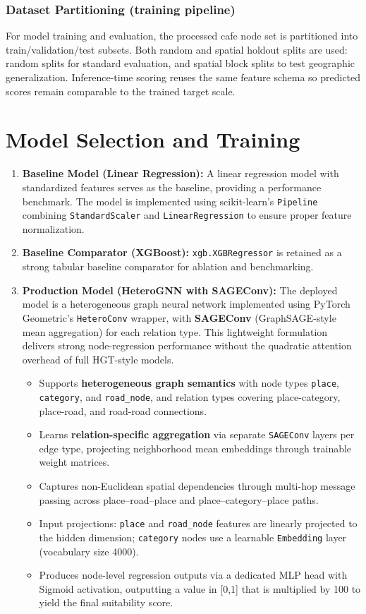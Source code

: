 \subsubsection{Dataset Partitioning (training pipeline)}
For model training and evaluation, the processed cafe node set is partitioned into train/validation/test subsets. Both random and spatial holdout splits are used: random splits for standard evaluation, and spatial block splits to test geographic generalization. Inference-time scoring reuses the same feature schema so predicted scores remain comparable to the trained target scale.

\section{Model Selection and Training}
\begin{enumerate}
	\item \textbf{Baseline Model (Linear Regression):} A linear regression model with standardized features serves as the baseline, providing a performance benchmark. The model is implemented using scikit-learn's \texttt{Pipeline} combining \texttt{StandardScaler} and \texttt{LinearRegression} to ensure proper feature normalization.
	
	\item \textbf{Baseline Comparator (XGBoost):} \texttt{xgb.XGBRegressor} is retained as a strong tabular baseline comparator for ablation and benchmarking.

	\item \textbf{Production Model (HeteroGNN with SAGEConv):} The deployed model is a heterogeneous graph neural network implemented using PyTorch Geometric's \texttt{HeteroConv} wrapper, with \textbf{SAGEConv} (GraphSAGE-style mean aggregation) for each relation type. This lightweight formulation delivers strong node-regression performance without the quadratic attention overhead of full HGT-style models.
    \begin{itemize}
        \item Supports \textbf{heterogeneous graph semantics} with node types \texttt{place}, \texttt{category}, and \texttt{road\_node}, and relation types covering place-category, place-road, and road-road connections.
        \item Learns \textbf{relation-specific aggregation} via separate \texttt{SAGEConv} layers per edge type, projecting neighborhood mean embeddings through trainable weight matrices.
        \item Captures non-Euclidean spatial dependencies through multi-hop message passing across place--road--place and place--category--place paths.
        \item Input projections: \texttt{place} and \texttt{road\_node} features are linearly projected to the hidden dimension; \texttt{category} nodes use a learnable \texttt{Embedding} layer (vocabulary size 4000).
        \item Produces node-level regression outputs via a dedicated MLP head with Sigmoid activation, outputting a value in [0,1] that is multiplied by 100 to yield the final suitability score.
    \end{itemize}
\end{enumerate}

